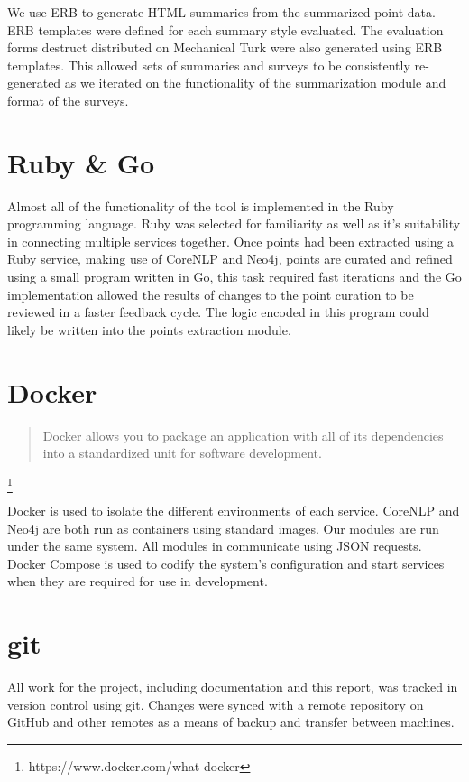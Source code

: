     We use ERB to generate HTML summaries from the summarized point data. ERB templates were defined for each summary style evaluated. The evaluation forms destruct distributed on Mechanical Turk were also generated using ERB templates. This allowed sets of summaries and surveys to be consistently re-generated as we iterated on the functionality of the summarization module and format of the surveys.

  \section{Ruby \& Go}
    Almost all of the functionality of the tool is implemented in the Ruby programming language. Ruby was selected for familiarity as well as it's suitability in connecting multiple services together. Once points had been extracted using a Ruby service, making use of CoreNLP and Neo4j, points are curated and refined using a small program written in Go, this task required fast iterations and the Go implementation allowed the results of changes to the point curation to be reviewed in a faster feedback cycle. The logic encoded in this program could likely be written into the points extraction module.

  \section{Docker}
    \blockquote{Docker allows you to package an application with all of its dependencies into a standardized unit for software development.} \footnote{https://www.docker.com/what-docker}

    Docker is used to isolate the different environments of each service. CoreNLP and Neo4j are both run as containers using standard images. Our modules are run under the same system. All modules in communicate using JSON requests. Docker Compose is used to codify the system's configuration and start services when they are required for use in development.

  \section{git}
    All work for the project, including documentation and this report, was tracked in version control using git. Changes were synced with a remote repository on GitHub and other remotes as a means of backup and transfer between machines.

